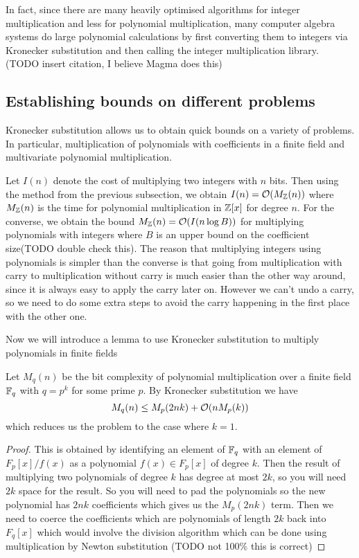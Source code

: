 In fact, since there are many heavily optimised algorithms for integer multiplication and less for polynomial multiplication, many computer algebra systems do large polynomial calculations by first converting them to integers via Kronecker substitution and then calling the integer multiplication library. (TODO insert citation, I believe Magma does this)

\subsection{Establishing bounds on different problems}%
\label{sub:Establishing bounds on different problems}

Kronecker substitution allows us to obtain quick bounds on a variety of problems. In particular, multiplication of polynomials with coefficients in a finite field and multivariate polynomial multiplication.

Let $I(n)$ denote the cost of multiplying two integers with $n$ bits. Then using the method from the previous subsection, we obtain $I(n) = \mathcal O(M_{\mathbb Z}(n))$ where $M_{\mathbb Z}(n)$ is the time for polynomial multiplication in ${\mathbb Z}[x]$ for degree $n$. For the converse, we obtain the bound $M_{\mathbb Z}(n) = \mathcal O(I(n\log B))$ for multiplying polynomials with integers where $B$ is an upper bound on the coefficient size(TODO double check this). The reason that multiplying integers using polynomials is simpler than the converse is that going from multiplication with carry to multiplication without carry is much easier than the other way around, since it is always easy to apply the carry later on. However we can't undo a carry, so we need to do some extra steps to avoid the carry happening in the first place with the other one.

Now we will introduce a lemma to use Kronecker substitution to multiply polynomials in finite fields

\begin{lemma}
    Let $M_q(n)$ be the bit complexity of polynomial multiplication over a finite field ${\mathbb F}_q$ with $q = p^k$ for some prime $p$. By Kronecker substitution we have
    \[
        M_q(n) \leq M_p(2nk) + \mathcal O(n M_p(k))
    \]
    which reduces us the problem to the case where $k = 1$.
\end{lemma}

\begin{proof}
    This is obtained by identifying an element of ${\mathbb F}_q$ with an element of $F_p[x]/f(x)$ as a polynomial $f(x) \in F_p[x]$ of degree $k$. Then the result of multiplying two polynomials of degree $k$ has degree at most $2k$, so you will need $2k$ space for the result. So you will need to pad the polynomials so the new polynomial has $2nk$ coefficients which gives us the $M_p(2nk)$ term. Then we need to coerce the coefficients which are polynomials of length $2k$ back into $F_q[x]$ which would involve the division algorithm which can be done using multiplication by Newton substitution (TODO not 100\% this is correct)

\end{proof}

